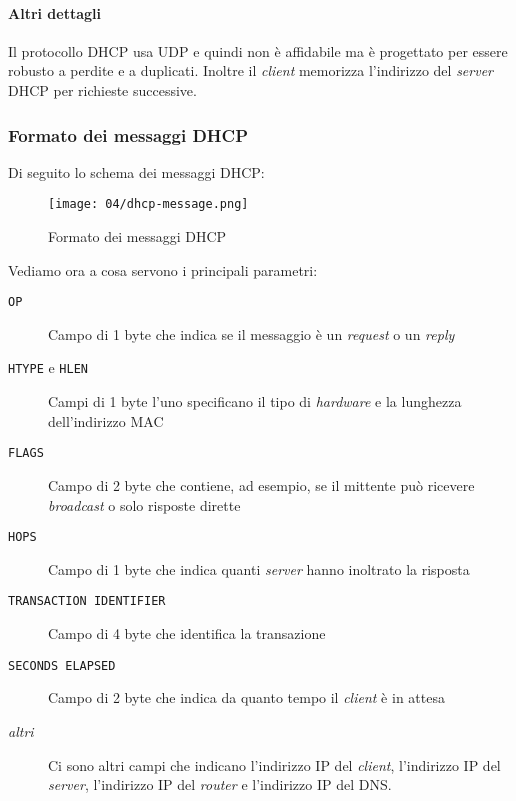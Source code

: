         \paragraph{Altri dettagli} Il protocollo \Acrshort*{DHCP} usa \Acrshort*{UDP} e quindi non è affidabile ma è progettato per essere robusto a perdite e a duplicati. Inoltre il \textit{client} memorizza l'indirizzo del \textit{server} \Acrshort*{DHCP} per richieste successive.
        \subsubsection{Formato dei messaggi \Acrshort*{DHCP}} 
            Di seguito lo schema dei messaggi \Acrshort*{DHCP}:
            
            \begin{figure}[H]
                \centering
                \texttt{[image: 04/dhcp-message.png]}
                \caption{Formato dei messaggi \Acrshort*{DHCP}}
            \end{figure}
            
            Vediamo ora a cosa servono i principali parametri:
            \begin{description}
                \item[\texttt{OP}] Campo di 1 byte che indica se il messaggio è un \textit{request} o un \textit{reply}
                \item[\texttt{HTYPE} e \texttt{HLEN}] Campi di 1 byte l'uno specificano il tipo di \textit{hardware} e la lunghezza dell'indirizzo \Acrshort*{MAC}
                \item[\texttt{FLAGS}] Campo di 2 byte che contiene, ad esempio, se il mittente può ricevere \textit{broadcast} o solo risposte dirette
                \item[\texttt{HOPS}] Campo di 1 byte che indica quanti \textit{server} hanno inoltrato la risposta
                \item[\texttt{TRANSACTION IDENTIFIER}] Campo di 4 byte che identifica la transazione
                \item[\texttt{SECONDS ELAPSED}] Campo di 2 byte che indica da quanto tempo il \textit{client} è in attesa
                \item[\textit{altri}] Ci sono altri campi che indicano l'indirizzo \Acrshort*{IP} del \textit{client}, l'indirizzo \Acrshort*{IP} del \textit{server}, l'indirizzo \Acrshort*{IP} del \textit{router} e l'indirizzo \Acrshort*{IP} del \Acrshort*{DNS}.
            \end{description}
